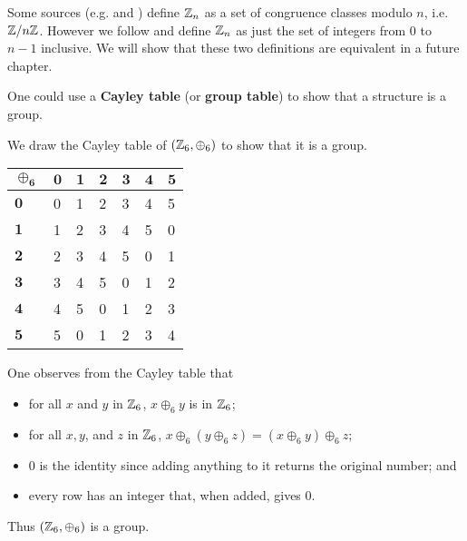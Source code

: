 \begin{remark}
    Some sources (e.g. {\cite[\S 33]{clark_1984}} and {\cite[Proposition 2.31]{humphreys_1996}}) define $\mathbb{Z}_n$ as a set of congruence classes modulo $n$, i.e. $\mathbb{Z}/n\mathbb{Z}$. However we follow \cite[p.~42]{gallian_2016} and define $\mathbb{Z}_n$ as just the set of integers from 0 to $n - 1$ inclusive. We will show that these two definitions are equivalent in a future chapter.
\end{remark}

One could use a \textbf{Cayley table} (or \textbf{group table}) to show that a structure is a group.
\begin{example}
    We draw the Cayley table of $(\mathbb{Z}_6, \oplus_6)$ to show that it is a group.
    \begin{table}[h]
        \centering
        \begin{tabular}{|l|l|l|l|l|l|l|}
        \hline
        $\boldsymbol{\oplus_6}$ & $\boldsymbol{0}$ & $\boldsymbol{1}$ & $\boldsymbol{2}$ & $\boldsymbol{3}$ & $\boldsymbol{4}$ & $\boldsymbol{5}$ \\ \hline
        $\boldsymbol{0}$          & 0          & 1          & 2          & 3          & 4          & 5          \\ \hline
        $\boldsymbol{1}$          & 1          & 2          & 3          & 4          & 5          & 0          \\ \hline
        $\boldsymbol{2}$          & 2          & 3          & 4          & 5          & 0          & 1          \\ \hline
        $\boldsymbol{3}$          & 3          & 4          & 5          & 0          & 1          & 2          \\ \hline
        $\boldsymbol{4}$          & 4          & 5          & 0          & 1          & 2          & 3          \\ \hline
        $\boldsymbol{5}$          & 5          & 0          & 1          & 2          & 3          & 4          \\ \hline
        \end{tabular}
    \end{table}

    One observes from the Cayley table that
    \begin{itemize}
        \item for all $x$ and $y$ in $\mathbb{Z}_6$, $x \oplus_6 y$ is in $\mathbb{Z}_6$;
        \item for all $x, y$, and $z$ in $\mathbb{Z}_6$, $x \oplus_6 (y \oplus_6 z) = (x \oplus_6 y) \oplus_6 z$;
        \item 0 is the identity since adding anything to it returns the original number; and
        \item every row has an integer that, when added, gives 0.
    \end{itemize}
    Thus $(\mathbb{Z}_6, \oplus_6)$ is a group.
\end{example}

